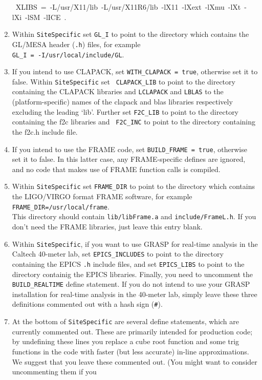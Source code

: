 \begin{enumerate}
\mbox{ XLIBS = -L/usr/X11/lib -L/usr/X11R6/lib -lX11 -lXext -lXmu -lXt -lXi -lSM -lICE
}.
\item
Within {\tt SiteSpecific} set {\tt GL\_I} to point to the
directory which contains the GL/MESA header ({\tt *.h}) files, for
example\\
\mbox{\tt GL\_I = -I/usr/local/include/GL}.
\item
If you intend to use CLAPACK, set {\tt WITH\_CLAPACK = true},
otherwise set it to false.  Within {\tt SiteSpecific} set {\tt
CLAPACK\_LIB} to point to the directory containing the CLAPACK
libraries and {\tt LCLAPACK} and {\tt LBLAS} to the
(platform-specific) names of the clapack and blas libraries
respectively excluding the leading `lib'. Further set {\tt F2C\_LIB}
to point to the directory containing the f2c libraries and {\tt
F2C\_INC} to point to the directory containing the f2c.h include file.
\item
If you intend to use the FRAME code, set {\tt BUILD\_FRAME = true},
otherwise set it to false.  In this latter case, any FRAME-specific defines
are ignored, and no code that makes use of FRAME function calls is
compiled.
\item
Within {\tt SiteSpecific} set {\tt FRAME\_DIR} to point to the directory
which contains the LIGO/VIRGO format FRAME software, for example\\
{\tt FRAME\_DIR=/usr/local/frame}.\\  
This directory should contain {\tt lib/libFrame.a} and {\tt include/FrameL.h}. 
If you don't need the FRAME
libraries, just leave this entry blank.
\item 
Within {\tt SiteSpecific}, if you want to use GRASP for real-time
analysis in the Caltech 40-meter lab, set {\tt EPICS\_INCLUDES} to point to the directory
containing the EPICS {\tt *.h} include files, and set {\tt EPICS\_LIBS} to point
to the directory containig the EPICS libraries.  Finally, you need to uncomment
the {\tt BUILD\_REALTIME} define statement.  If you do not intend to use
your GRASP installation for real-time analysis in the 40-meter lab, simply leave
these three definitions commented out with a hash sign ({\tt \#}).
\item
At the bottom of {\tt SiteSpecific} are several define statements,
which are currently commented out.  These are primarily intended for
production code; by undefining these lines you replace a cube root
function and some trig functions in the code with faster (but less
accurate) in-line approximations.  We suggest that you leave these
commented out.  (You might want to consider uncommenting them if you

\end{enumerate}
